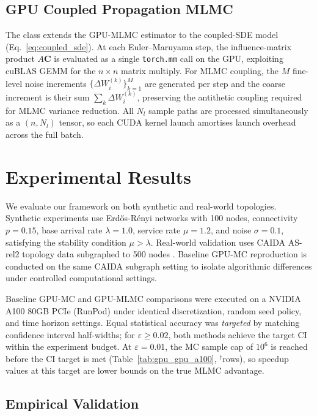 \documentclass{ieeeaccess}
\begin{document}
\subsection{GPU Coupled Propagation MLMC}
\label{subsec:gpu_coupled}

The  class extends the GPU-MLMC estimator to the coupled-SDE
model (Eq.~\eqref{eq:coupled_sde}). At each Euler--Maruyama step, the influence-matrix product
$A\mathbf{C}$ is evaluated as a single \texttt{torch.mm} call on the GPU, exploiting cuBLAS GEMM
for the $n \times n$ matrix multiply. For MLMC coupling, the $M$ fine-level noise increments
$\{\Delta W_i^{(k)}\}_{k=1}^{M}$ are generated per step and the coarse increment is their sum
$\sum_k \Delta W_i^{(k)}$, preserving the antithetic coupling required for MLMC variance
reduction. All $N_l$ sample paths are processed simultaneously as a $(n{,}N_l)$ tensor, so each
CUDA kernel launch amortises launch overhead across the full batch.

\section{Experimental Results}

We evaluate our framework on both synthetic and real-world topologies. Synthetic experiments use
Erd\H{o}s-R\'enyi networks with 100 nodes, connectivity $p=0.15$, base arrival rate $\lambda=1.0$,
service rate $\mu=1.2$, and noise $\sigma=0.1$, satisfying the stability condition $\mu > \lambda$.
Real-world validation uses CAIDA AS-rel2 topology data subgraphed to 500 nodes
\cite{hofstad2016}. Baseline GPU-MC reproduction is conducted on the same CAIDA subgraph setting
to isolate algorithmic differences under controlled computational settings.

Baseline GPU-MC and GPU-MLMC comparisons were executed on a NVIDIA A100 80GB PCIe (RunPod)
under identical discretization, random seed policy, and time horizon settings. Equal statistical
accuracy was \emph{targeted} by matching confidence interval half-widths; for $\varepsilon \geq
0.02$, both methods achieve the target CI within the experiment budget. At $\varepsilon=0.01$,
the MC sample cap of $10^6$ is reached before the CI target is met
(Table~\ref{tab:gpu_gpu_a100}, $^\dagger$rows), so speedup values at this target are lower bounds
on the true MLMC advantage.

\subsection{Empirical Validation}
\end{document}
